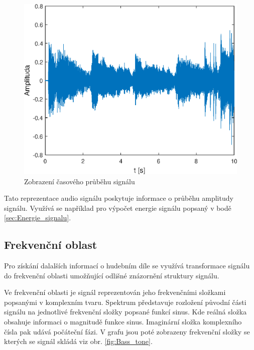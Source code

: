   \begin{figure}[H]
    \centering
    \includegraphics[width = 0.8\linewidth]{obrazky/Waveform.eps}
    \caption{Zobrazení časového průběhu signálu}
    \label{fig:Waveform}
  \end{figure}

  Tato reprezentace audio signálu poskytuje informace o průběhu amplitudy signálu.
  Využívá se například pro výpočet energie signálu popsaný v bodě \ref{sec:Energie_signalu}.
  
  \subsection{Frekvenční oblast} \label{sec:FT}
  Pro získání dalalších informací o hudebním díle se využívá transformace signálu do frekvenční oblasti umožňující odlišné znázornění struktury signálu.

  Ve frekvenční oblasti je signál reprezentován jeho frekvenčními složkami popsanými v komplexním tvaru.
  Spektrum představuje rozložení původní části signálu na jednotlivé frekvenční složky popsané funkcí sinus. Kde reálná složka obsahuje informaci o magnitudě  funkce sinus.
  Imaginární složka komplexního čísla pak udává počáteční fázi.
  V grafu jsou poté zobrazeny frekvenční složky se kterých se signál skládá viz obr. \ref{fig:Bass_tone}.



